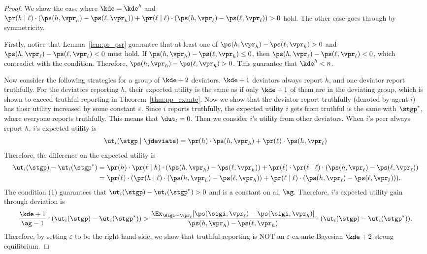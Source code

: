 \begin{proof}
    We show the case where $\kde = \kde^h$ and $\pr(h\mid \ell) \cdot (\ps(h, \vpr_h) - \ps(\ell, \vpr_h)) + \pr(\ell \mid \ell)\cdot (\ps(h, \vpr_\ell) - \ps(\ell, \vpr_{\ell})) > 0$ hold. The other case goes through by symmetricity.

    Firstly, notice that Lemma~\ref{lem:pr_psr} guarantee that at least one of $\ps(h, \vpr_h) - \ps(\ell, \vpr_h) > 0$ and $\ps(h, \vpr_\ell) - \ps(\ell, \vpr_{\ell}) < 0$ must hold. If $\ps(h, \vpr_h) - \ps(\ell, \vpr_h) \le 0$, then $\ps(h, \vpr_\ell) - \ps(\ell, \vpr_{\ell}) < 0$, which contradict with the condition. Therefore, $\ps(h, \vpr_h) - \ps(\ell, \vpr_h) > 0$. This guarantee that $\kde^h < n$. 

    Now consider the following strategies for a group of $\kde + 2$ deviators. $\kde + 1$ deviators always report $h$, and one deviator report truthfully. For the deviators reporting $h$, their expected utility is the same as if only $\kde + 1$ of them are in the deviating group, which is shown to exceed truthful reporting in Theorem~\ref{thm:pp_exante}. Now we show that the deviator report truthfully (denoted by agent $i$) has their utility increased by some constant $\varepsilon$.
    Since $i$ reports truthfully, the expected utility $i$ gets from truthful is the same with $\stgp^*$, where everyone reports truthfully. This means that $\dut_t = 0$. Then we consider $i$'s utility from other deviators. When $i$'s peer always report $h$, $i$'s expected utility is
    \begin{equation*}
        \ut_i(\stgp \mid \jdeviate) = \pr(h)\cdot \ps(h, \vpr_h) + \pr(\ell)\cdot \ps(h, \vpr_\ell)
    \end{equation*}
    Therefore, the difference on the expected utility is 
    \begin{align*}
        \ut_i(\stgp) - \ut_i(\stgp^*) =&\ \pr(h)\cdot\pr(\ell \mid h)\cdot (\ps(h, \vpr_h) - \ps(\ell, \vpr_h)) + \pr(\ell)\cdot \pr(\ell\mid \ell) \cdot (\ps(h, \vpr_\ell) - \ps(\ell, \vpr_\ell))\\
        =&\ \pr(\ell) \cdot (\pr(h \mid \ell)\cdot (\ps(h, \vpr_h) - \ps(\ell, \vpr_h)) + \pr(\ell\mid \ell) \cdot (\ps(h, \vpr_\ell) - \ps(\ell, \vpr_\ell))).
    \end{align*}
    The condition (1) guarantees that $\ut_i(\stgp) - \ut_i(\stgp^*) > 0$ and is a constant on all $\ag$. Therefore, $i$'s expected utility gain through deviation is
    \begin{equation*}
        \frac{\kde + 1}{\ag - 1}\cdot (\ut_i(\stgp) - \ut_i(\stgp^*)) > \frac{\Ex_{\sigi\sim \vpr_{\ell}}[\ps(\sigi, \vpr_{\ell}) - \ps(\sigi, \vpr_{h})]}{\ps(h, \vpr_h) - \ps(\ell, \vpr_h)} \cdot (\ut_i(\stgp) - \ut_i(\stgp^*)). 
    \end{equation*}
    Therefore, by setting $\varepsilon$ to be the right-hand-side, we show that truthful reporting is NOT an $\varepsilon$-ex-ante Bayesian $\kde + 2$-strong equilibrium. 
\end{proof}

